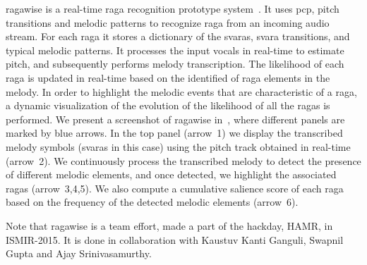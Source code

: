 \gls{ragawise} is a real-time \gls{raga} recognition prototype system~\citep{ragawise}. It uses \gls{pcp}, pitch transitions and melodic patterns to recognize \gls{raga} from an incoming audio stream. For each \gls{raga} it stores a dictionary of the \glspl{svara}, \gls{svara} transitions, and typical melodic patterns. It processes the input vocals in real-time to estimate pitch, and subsequently performs melody transcription. The likelihood of each \gls{raga} is updated in real-time based on the identified of \gls{raga} elements in the melody. In order to highlight the melodic events that are characteristic of a \gls{raga}, a dynamic visualization of the evolution of the likelihood of all the \glspl{raga} is performed. We present a screenshot of \gls{ragawise} in~, where different panels are marked by blue arrows. In the top panel (arrow~1) we display the transcribed melody symbols (\glspl{svara} in this case) using the pitch track obtained in real-time (arrow~2). We continuously process the transcribed melody to detect the presence of different melodic elements, and once detected, we highlight the associated \glspl{raga} (arrow~3,4,5). We also compute a cumulative salience score of each \gls{raga} based on the frequency of the detected melodic elements (arrow~6). 

Note that \gls{ragawise} is a team effort, made a part of the hackday, HAMR, in ISMIR-2015. It is done in collaboration with Kaustuv Kanti Ganguli, Swapnil Gupta and Ajay Srinivasamurthy. 


